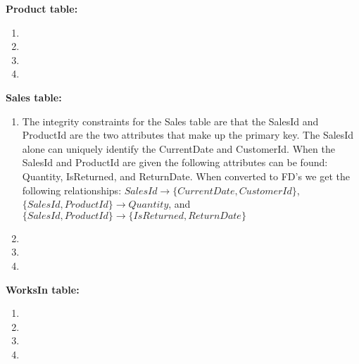\documentclass{article}
\begin{document}
  \par\textbf{Product table:}
  \begin{enumerate}[label=\roman*]
  	\item
  	\item
  	\item
  	\item
  \end{enumerate}
  \par\textbf{Sales table:}
  \begin{enumerate}[label=\roman*]
  	\item The integrity constraints for the Sales table are that the SalesId and ProductId are the two attributes that make up
    the primary key. The SalesId alone can uniquely identify the CurrentDate and CustomerId. When the SalesId and ProductId are given
    the following attributes can be found: Quantity, IsReturned, and ReturnDate. When converted to FD's we get the following
    relationships: $SalesId\rightarrow\{CurrentDate,CustomerId\}$, $\{SalesId,ProductId\}\rightarrow Quantity$, and 
    $\{SalesId,ProductId\}\rightarrow\{IsReturned,ReturnDate\}$
  	\item
  	\item
  	\item
  \end{enumerate}
  \par\textbf{WorksIn table:}
  \begin{enumerate}[label=\roman*]
  	\item
  	\item
  	\item
  	\item
  \end{enumerate}
\end{document}

